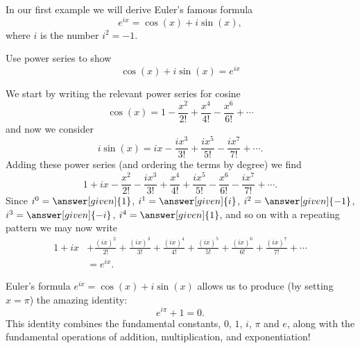 \documentclass{ximera}
\begin{document}
In our first example we will derive Euler's famous formula
\[
e^{ix} = \cos(x) + i \sin(x),
\]
where $i$ is the number $i^2=-1$.

\begin{example}
  Use power series to show
  \[
  \cos(x) + i \sin(x) = e^{ix} 
  \]
  \begin{explanation}
    We start by writing the relevant power series for cosine
    \[
    \cos(x) = 1-\frac{x^2}{2!} + \frac{x^4}{4!} -\frac{x^6}{6!} + \cdots
    \]
    and now we consider
    \[
    i \sin(x) = ix - \frac{ix^3}{3!} + \frac{ix^5}{5!} -\frac{i x^7}{7!} + \cdots.
    \]
    Adding these power series (and ordering the terms by degree) we find
    \[
    1+ ix -\frac{x^2}{2!} - \frac{ix^3}{3!} + \frac{x^4}{4!} + \frac{ix^5}{5!} -\frac{x^6}{6!} -\frac{i x^7}{7!} + \cdots.
    \]
    Since $i^0=\answer[given]{1}$,
    $i^1= \answer[given]{i}$,
    $i^2 = \answer[given]{-1}$,
    $i^3 = \answer[given]{-i}$,
    $i^4 = \answer[given]{1}$, and so on with a repeating pattern we may now write
    \begin{align*}
      1+ ix &+\frac{(ix)^2}{2!} + \frac{(ix)^3}{3!} + \frac{(ix)^4}{4!} + \frac{(ix)^5}{5!} +\frac{(ix)^6}{6!} +\frac{(i x)^7}{7!} + \cdots\\
      &= e^{ix}.
    \end{align*}
  \end{explanation}
\end{example}

Euler's formula $e^{ix} = \cos(x) + i \sin(x)$ allows us to produce
(by setting $x=\pi$) the amazing identity:
\[
e^{i \pi } + 1 = 0.
\]
This identity combines the fundamental constants, $0$, $1$, $i$,
$\pi$ and $e$, along with the fundamental operations of addition,
multiplication, and exponentiation!
\end{document}
